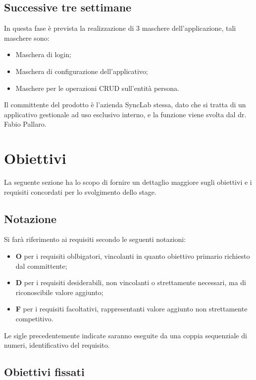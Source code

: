 \subsection{Successive tre settimane}
In questa fase è prevista la realizzazione di 3 maschere dell'applicazione, tali maschere sono:

\begin{itemize}
	\item Maschera di login;
	\item Maschera di configurazione dell'applicativo;
	\item Maschere per le operazioni \gls{CRUD} sull'entità persona.
\end{itemize}

Il committente del prodotto è l'azienda SyncLab stessa, dato che si tratta di un applicativo gestionale ad uso esclusivo interno, e la funzione viene svolta dal dr. Fabio Pallaro.

\section{Obiettivi}
La seguente sezione ha lo scopo di fornire un dettaglio maggiore sugli obiettivi e i requisiti concordati per lo svolgimento dello stage.

\subsection{Notazione}
Si farà riferimento ai requisiti secondo le seguenti notazioni:
\begin{itemize}
	\item \textbf{O} per i requisiti oblbigatori, vincolanti in quanto obiettivo primario richiesto
	dal committente;
	\item \textbf{D} per i requisiti desiderabili, non vincolanti o strettamente necessari, ma di
	riconoscibile valore aggiunto;
	\item \textbf{F} per i requisiti facoltativi, rappresentanti valore aggiunto non strettamente
	competitivo.
\end{itemize}
Le sigle precedentemente indicate saranno eseguite da una coppia sequenziale di
numeri, identificativo del requisito.
\subsection{Obiettivi fissati}

